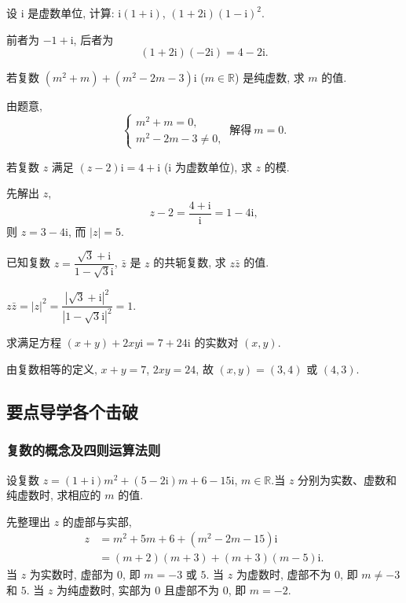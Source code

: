 \lianxi
\begin{exercise}
    设 $\mathrm{i}$ 是虚数单位, 计算: $\mathrm{i}(1+\mathrm{i})$, $(1+2\mathrm{i})(1-\mathrm{i})^2$.
\end{exercise}
\beginsolution
    前者为 $-1+\mathrm{i}$, 后者为
    \[(1+2\mathrm{i})(-2\mathrm{i})= 4-2\mathrm{i}.\]
\endsolution

\begin{exercise}
    若复数 $(m^2 +m)+(m^2-2m-3)\mathrm{i}$ ($m\in\mathbb{R}$) 是纯虚数,
    求 $m$ 的值.
\end{exercise}
\beginsolution
    由题意,
    \[\left\{\!\!\begin{array}{l}
        m^2 +m=0,\\
        m^2-2m-3\neq 0,
    \end{array}\right.\ \text{解得}\ m=0.\]
\endsolution

\begin{exercise}
    若复数 $z$ 满足 $(z-2)\mathrm{i}= 4+\mathrm{i}$ ($\mathrm{i}$ 为虚数单位), 求 $z$ 的模.
\end{exercise}
\beginsolution
    先解出 $z$, 
    \[z-2= \frac{4+\mathrm{i}}{\mathrm{i}}= 1- 4\mathrm{i},\]
    则 $z= 3-4\mathrm{i}$, 而 $|z|= 5$.
\endsolution

\begin{exercise}
    已知复数 $z=\dfrac{\sqrt3+\mathrm{i}}{1-\sqrt3\mathrm{i}}$, 
    $\bar{z}$ 是 $z$ 的共轭复数, 求 $z\bar{z}$ 的值.
\end{exercise}
\beginsolution
    $z\bar{z}= |z|^2= \dfrac{|\sqrt3+ \mathrm{i}|^2}{|1- \sqrt3\mathrm{i}|^2}= 1$.
\endsolution

\begin{exercise}
    求满足方程 $(x+y)+ 2xy\mathrm{i}= 7+24\mathrm{i}$ 的实数对 $(x,y)$.
\end{exercise}
\beginsolution
    由复数相等的定义, $x+y=7$, $2xy=24$, 故 $(x,y)= (3,4)$ 或 $(4,3)$.
\endsolution

\subsection{要点导学\quad 各个击破}
\subsubsection{复数的概念及四则运算法则}
\begin{example}
    设复数 $z=(1+\mathrm{i})m^2+ (5-2\mathrm{i})m+ 6-15\mathrm{i}$, $m\in\mathbb{R}. $当 $z$ 分别为实数、虚数和纯虚数时, 求相应的 $m$ 的值.
\end{example}
\beginsolution
    先整理出 $z$ 的虚部与实部,
    \[\begin{aligned}
        z&= m^2+5m+6+ (m^2-2m-15)\mathrm{i}\\
        &= (m+2)(m+3)+ (m+3)(m-5)\mathrm{i}.
    \end{aligned}\]
    当 $z$ 为实数时, 虚部为 $0$, 即 $m= -3$ 或 $5$. 当 $z$ 为虚数时, 虚部不为 $0$, 即 $m\neq -3$ 和 $5$. 当 $z$ 为纯虚数时, 实部为 $0$ 且虚部不为 $0$, 即 $m= -2$. 
\endsolution

